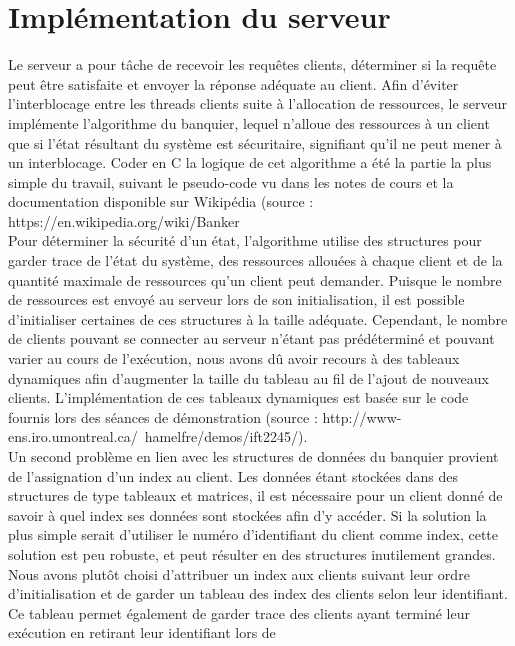 \documentclass[11pt]{article}
\begin{document}
\section*{ Implémentation du serveur }
\setlength{\parindent}{20pt}
Le serveur a pour tâche de recevoir les requêtes clients, déterminer si la requête peut être satisfaite et envoyer la réponse adéquate au client. Afin 
d’éviter l’interblocage entre les threads clients suite à l’allocation de ressources, le serveur implémente l’algorithme du banquier, lequel n’alloue des
 ressources à un client que si l’état résultant du système est sécuritaire, signifiant qu’il ne peut mener à un interblocage. Coder en C la logique de cet
 algorithme a été la partie la plus simple du travail, suivant le pseudo-code vu dans les notes de cours et la documentation disponible sur Wikipédia 
 (source : https://en.wikipedia.org/wiki/Banker%
\\
Pour déterminer la sécurité d’un état, l’algorithme utilise des structures pour garder trace de l’état du système, des ressources allouées à chaque client
 et de la quantité maximale de ressources qu’un client peut demander. Puisque le nombre de ressources est envoyé au serveur lors de son initialisation, il
 est possible d’initialiser certaines de ces structures à la taille adéquate. Cependant, le nombre de clients pouvant se connecter au serveur n’étant pas
 prédéterminé et pouvant varier au cours de l’exécution, nous avons dû avoir recours à des tableaux dynamiques afin d’augmenter la taille du tableau au fil 
 de l’ajout de nouveaux clients. L’implémentation de ces tableaux dynamiques est basée sur le code fournis lors des séances de démonstration 
 (source : http://www-ens.iro.umontreal.ca/~hamelfre/demos/ift2245/). 
\\
Un second problème en lien avec les structures de données du banquier provient de l’assignation d’un index au client. Les données étant stockées dans des 
structures de type tableaux et matrices, il est nécessaire pour un client donné de savoir à quel index ses données sont stockées afin d’y accéder. Si la
 solution la plus simple serait d’utiliser le numéro d’identifiant du client comme index, cette solution est peu robuste, et peut résulter en des structures 
 inutilement grandes. Nous avons plutôt choisi d’attribuer un index aux clients suivant leur ordre d’initialisation et de garder un tableau des index des 
 clients selon leur identifiant. Ce tableau permet également de garder trace des clients ayant terminé leur exécution en retirant leur identifiant lors de 
\end{document}
